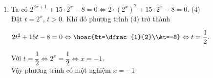 \begin{bt}
{\begin{enumerate}
			Với $t=\dfrac{1}{4}  \Leftrightarrow 2^x=\dfrac{1}{4}\Leftrightarrow x=-2$.\\
			Vậy phương trình có hai nghiệm  $x=2$, $x=-2$.
			\item Ta có $2^{2x+1}+15\cdot 2^x-8=0 \Leftrightarrow 2\cdot \left(2^x\right)^2+15\cdot 2^x-8=0$. \qquad  ($4$)\\
			Đặt $t=2^x$, $t>0$. Khi đó phương trình ($4$) trở thành 
			\begin{center}
				$2t^2+15t-8=0 \Leftrightarrow \hoac{&t=\dfrac{1}{2}\\&t=-8}\Leftrightarrow  t=\dfrac{1}{2}.$
			\end{center}
			Với $t=\dfrac{1}{2} \Leftrightarrow 2^x=\dfrac{1}{2}\Leftrightarrow x=-1$.\\ 
			Vậy phương trình có một nghiệm $x=-1$ 
		\end{enumerate}
	} 
\end{bt}

